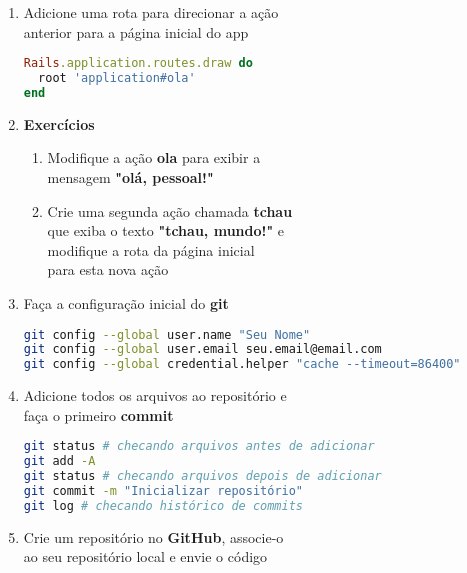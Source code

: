 \documentclass[a4paper,12pt]{article}
\begin{document}
\begin{enumerate}
  \pagebreak

  \item Adicione uma rota para direcionar a ação \\
        anterior para a página inicial do app

    \begin{lstlisting}[language=Ruby, title=config/routes.rb]
Rails.application.routes.draw do
  root 'application#ola'
end
    \end{lstlisting}

  \item \textbf{Exercícios}

    \begin{enumerate}
      \item Modifique a ação \textbf{ola} para exibir a \\
            mensagem \textbf{"olá, pessoal!"}
      \item Crie uma segunda ação chamada \textbf{tchau} \\
            que exiba o texto \textbf{"tchau, mundo!"} e \\
            modifique a rota da página inicial \\
            para esta nova ação
    \end{enumerate}

  \item Faça a configuração inicial do \textbf{git}

    \begin{lstlisting}[language=Bash, basicstyle=\fontsize{8.6}{12}\selectfont\ttfamily]
git config --global user.name "Seu Nome"
git config --global user.email seu.email@email.com
git config --global credential.helper "cache --timeout=86400"
    \end{lstlisting}

  \item Adicione todos os arquivos ao repositório e \\
        faça o primeiro \textbf{commit}

    \begin{lstlisting}[language=Bash, commentstyle=\color{gray}]
git status # checando arquivos antes de adicionar
git add -A
git status # checando arquivos depois de adicionar
git commit -m "Inicializar repositório"
git log # checando histórico de commits
    \end{lstlisting}

  \item Crie um repositório no \textbf{GitHub}, associe-o \\
        ao seu repositório local e envie o código


\end{enumerate}
\end{document}
